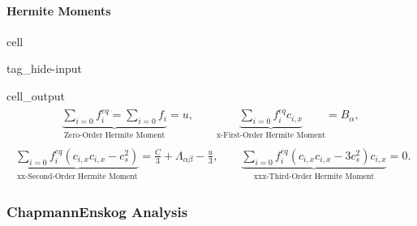 \documentclass[letterpaper,10pt,english,openany,oneside]{jupyterBook}
\begin{document}
\paragraph{Hermite Moments}
\label{\detokenize{LBM-Study/Convective-Diffusive-Equation:hermite-moments}}
\begin{sphinxuseclass}{cell}
\begin{sphinxuseclass}{tag_hide-input}\begin{sphinxVerbatimOutput}

\begin{sphinxuseclass}{cell_output}\begin{equation*}
\begin{split}\displaystyle \begin{gathered}\underbrace{\sum_{i=0} f_{i}^{eq} =\sum_{i=0} f_{i} }_{\textrm{Zero-Order Hermite Moment}} =u,\quad \quad \underbrace{\sum_{i=0} f_{i}^{eq}c_{i,x} }_{\textrm{x-First-Order Hermite Moment}} =B_{\alpha},\end{gathered}\end{split}
\end{equation*}\begin{equation*}
\begin{split}\displaystyle \begin{gathered}\underbrace{\sum_{i=0} f_{i}^{eq} \left(c_{i,x}c_{i,x} - c_{s}^{2} \right) }_{\textrm{xx-Second-Order Hermite Moment}} =\frac{C}{3} + \Lambda_{\alpha\beta} - \frac{u}{3},\quad \quad \underbrace{\sum_{i=0} f_{i}^{eq} \left(c_{i,x}c_{i,x} - 3c_{s}^{2} \right) c_{i,x} }_{\textrm{xxx-Third-Order Hermite Moment}} =0.\end{gathered}\end{split}
\end{equation*}
\end{sphinxuseclass}\end{sphinxVerbatimOutput}

\end{sphinxuseclass}
\end{sphinxuseclass}

\subsubsection{Chapmann\sphinxhyphen{}Enskog Analysis}
\label{\detokenize{LBM-Study/Convective-Diffusive-Equation:chapmann-enskog-analysis}}
\end{document}
